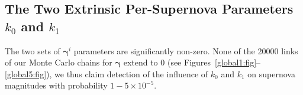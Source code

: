 \documentclass{aastex61}   	%
\begin{document}
\subsection{The Two Extrinsic Per-Supernova Parameters $k_0$ and $k_1$}
The two sets of  $\pmb{\gamma}^i$ parameters  are significantly non-zero. 
None of the 20000 links of 
our Monte Carlo chains for $\pmb{\gamma}$ extend to 0 (see Figures~\ref{global1:fig}--\ref{global5:fig}), we thus claim detection of the
influence of $k_0$ and $k_1$  on supernova magnitudes
with probability $1-5\times 10^{-5}$.
%
%
%
%
%
\end{document}
